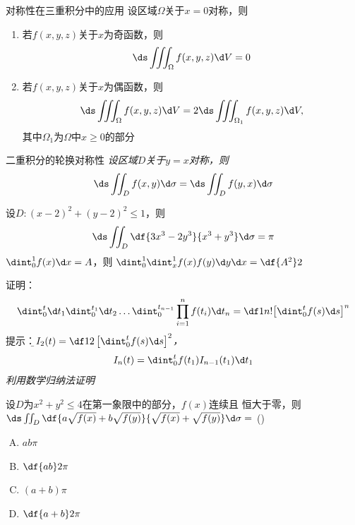 \begin{frame}
	\linespread{1.5}
	\it
	\begin{exampleblock}{对称性在三重积分中的应用}
		设区域$\Omega$关于$x=0$对称，则
		\begin{enumerate}
		  \item 若$f(x,y,z)$关于$x$为奇函数，则
		  $$\ds\iiint_{\Omega}f(x,y,z)\d V=0$$
		  \item \pause 若$f(x,y,z)$关于$x$为偶函数，则
		  $$\ds\iiint_{\Omega}f(x,y,z)\d V
		  =2\ds\iiint_{\Omega_1}f(x,y,z)\d V,$$
		  其中$\Omega_1$为$\Omega$中$x\geq0$的部分
		\end{enumerate}
	\end{exampleblock}
\end{frame}

\begin{frame}
	\linespread{1.5}
	\begin{exampleblock}{二重积分的轮换对称性}
		{\it 设区域$D$关于$y=x$对称，则}
		$$\ds\iint_Df(x,y)\d\sigma=\ds\iint_Df(y,x)\d\sigma$$
	\end{exampleblock}
	\bigskip\pause
	设$D:(x-2)^2+(y-2)^2\leq 1$，则
	$$\ds\iint_D\df{3x^3-2y^3}{x^3+y^3}\d\sigma=\pi$$
	\bigskip\pause
	$\dint_0^1f(x)\d x=A$，则
	$\dint_0^1\dint_x^1f(x)f(y)\d y\d x=\df{A^2}2$
\end{frame}

\begin{frame}
	\linespread{1.2}
		证明：
		$$\dint_0^t\d t_1\dint_0^{t_1}\d t_2\ldots
		\dint_0^{t_{n-1}}\prod\limits_{i=1}^nf(t_i)\d t_n
		=\df1{n!}{\left[\dint_0^tf(s)\d s\right]^n}$$
	\bigskip\pause
	\alert{提示：}{\it\b $I_2(t)=\df12\left[\dint_0^tf(s)\d s\right]^2$，
	$$I_n(t)=\dint_0^tf(t_1)I_{n-1}(t_1)\d t_1$$
	利用数学归纳法证明
	}
\end{frame}

\begin{frame}
	\linespread{1.5}
	设$D$为$x^2+y^2\leq 4$在第一象限中的部分，$f(x)$连续且
	恒大于零，则$\ds\iint_D\df{a\sqrt{f(x)}+b\sqrt{f(y)}}
	{\sqrt{f(x)}+\sqrt{f(y)}}\d\sigma=$
	(\underline{\;})
	\begin{enumerate}[(A)]
	  \item $ab\pi$
	  \item $\df{ab}2\pi$
	  \item $(a+b)\pi$
	  \item $\df{a+b}2\pi$
	\end{enumerate}
\end{frame}

